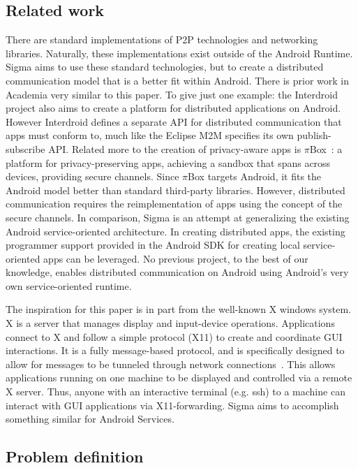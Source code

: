 \documentclass[prodmode]{acmlarge}
\begin{document}
\subsection{Related work}
There are standard implementations of P2P technologies and networking libraries. Naturally, these implementations exist outside of the Android Runtime. Sigma aims to use these standard technologies, but to create a distributed communication model that is a better fit within Android. There is prior work in Academia very similar to this paper. To give just one example: the Interdroid~\cite{Interdroid} project also aims to create a platform for distributed applications on Android. However Interdroid defines a separate API for distributed communication that apps must conform to, much like the Eclipse M2M specifies its own publish-subscribe API. Related more to the creation of privacy-aware apps is $\pi$Box~\cite{piBox}: a platform for privacy-preserving apps, achieving a sandbox that spans across devices, providing secure channels. Since $\pi$Box targets Android, it fits the Android model better than standard third-party libraries. However, distributed communication requires the reimplementation of apps using the concept of the secure channels. In comparison, Sigma is an attempt at generalizing the existing Android service-oriented architecture. In creating distributed apps, the existing programmer support provided in the Android SDK for creating local service-oriented apps can be leveraged. No previous project, to the best of our knowledge, enables distributed communication on Android using Android's very own service-oriented runtime.

The inspiration for this paper is in part from the well-known X windows system. X is a server that manages display and input-device operations. Applications connect to X and follow a simple protocol (X11) to create and coordinate GUI interactions. It is a fully message-based protocol, and is specifically designed to allow for messages to be tunneled through network connections~\cite{X11}. This allows applications running on one machine to be displayed and controlled via a remote X server. Thus, anyone with an interactive terminal (e.g. ssh) to a machine can interact with GUI applications via X11-forwarding. Sigma aims to accomplish something similar for Android Services.

\subsection{Problem definition}
\end{document}

